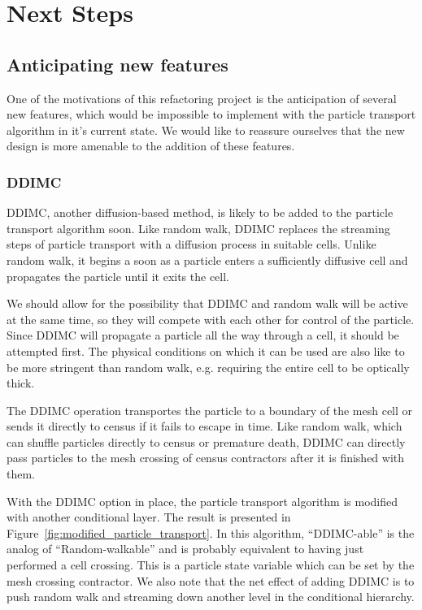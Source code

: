 \documentclass[memo]{ResearchNote}
\begin{document}
\section{Next Steps}

\subsection{Anticipating new features}

One of the motivations of this refactoring project is the anticipation
of several new features, which would be impossible to implement with
the particle transport algorithm in it's current state. We would like
to reassure ourselves that the new design is more amenable to the
addition of these features. 

\subsubsection{DDIMC}

DDIMC, another diffusion-based method, is likely to be added to the
particle transport algorithm soon. Like random walk, DDIMC replaces
the streaming steps of particle transport with a diffusion process in
suitable cells. Unlike random walk, it begins a soon as a particle
enters a sufficiently diffusive cell and propagates the particle until
it exits the cell.

We should allow for the possibility that DDIMC and random walk will be
active at the same time, so they will compete with each other for
control of the particle. Since DDIMC will propagate a particle all the
way through a cell, it should be attempted first. The physical
conditions on which it can be used are also like to be more stringent
than random walk, e.g. requiring the entire cell to be optically
thick.

The DDIMC operation transportes the particle to a boundary of the mesh
cell or sends it directly to census if it fails to escape in time.
Like random walk, which can shuffle particles directly to census or
premature death, DDIMC can directly pass particles to the mesh
crossing of census contractors after it is finished with them.

With the DDIMC option in place, the particle transport algorithm is
modified with another conditional layer. The result is presented in
Figure~\ref{fig:modified_particle_transport}. In this algorithm,
``DDIMC-able'' is the analog of ``Random-walkable'' and is probably
equivalent to having just performed a cell crossing. This is a
particle state variable which can be set by the mesh crossing
contractor. We also note that the net effect of adding DDIMC is to
push random walk and streaming down another level in the conditional
hierarchy.
\end{document}

